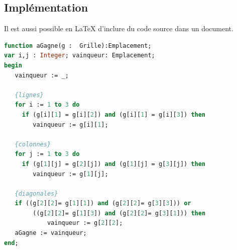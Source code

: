     \subsection{Implémentation}
        Il est aussi possible en \LaTeX{} d'inclure du code source dans un document.
        
        \begin{lstlisting}[language=Pascal,frame=single,caption=code source de la fonction aGagne.]
function aGagne(g :  Grille):Emplacement;
var i,j : Integer; vainqueur: Emplacement;
begin
   vainqueur := _;

   {lignes}
   for i := 1 to 3 do
   	 if (g[i][1] = g[i][2]) and (g[i][1] = g[i][3]) then 
		vainqueur := g[i][1];
	
   {colonnes}
   for j := 1 to 3 do
   	 if (g[1][j] = g[2][j]) and (g[1][j] = g[3][j]) then 
		vainqueur := g[1][j];
   
   {diagonales}   
   if ((g[2][2]= g[1][1]) and (g[2][2]= g[3][3])) or
		((g[2][2]= g[1][3]) and (g[2][2]= g[3][1])) then
			vainqueur := g[2][2];
   aGagne := vainqueur;
end;
        \end{lstlisting}
